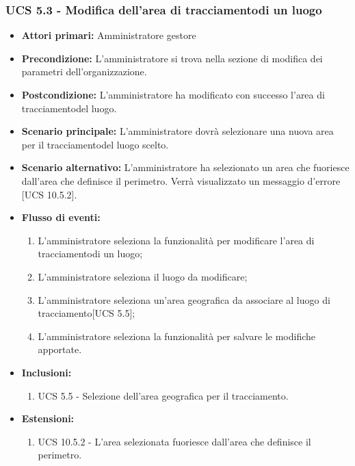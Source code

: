 \subsubsection{UCS 5.3 - Modifica dell'area di tracciamentodi un luogo}%
\begin{itemize}
    \item \textbf{Attori primari:} Amministratore gestore
    \item \textbf{Precondizione:} L'amministratore si trova nella sezione di modifica dei parametri dell'organizzazione.
    \item \textbf{Postcondizione:} L'amministratore ha modificato con successo l'area di tracciamentodel luogo.
    \item \textbf{Scenario principale:} L'amministratore dovrà selezionare una nuova area per il tracciamentodel luogo scelto.
    \item \textbf{Scenario alternativo:} L'amministratore ha selezionato un area che fuoriesce dall'area che definisce il perimetro. Verrà visualizzato un messaggio d'errore [UCS 10.5.2].
    \item \textbf{Flusso di eventi:}
    \begin{enumerate}%
        \item L'amministratore seleziona la funzionalità per modificare l'area di tracciamentodi un luogo;
        \item L'amministratore seleziona il luogo da modificare;
        \item L'amministratore seleziona un'area geografica da associare al luogo di tracciamento[UCS 5.5];
        \item L'amministratore seleziona la funzionalità per salvare le modifiche apportate.
    \end{enumerate}
    \item \textbf{Inclusioni:}
    \begin{enumerate}
        \item UCS 5.5 - Selezione dell'area geografica per il tracciamento.
    \end{enumerate}
    \item \textbf{Estensioni:}
    \begin{enumerate}
        \item UCS 10.5.2 - L'area selezionata fuoriesce dall'area che definisce il perimetro.
    \end{enumerate}
\end{itemize}

